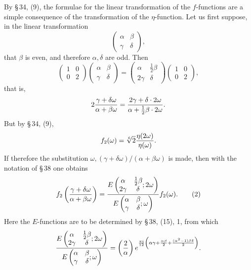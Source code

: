 \documentclass[11pt]{article}
\newcommand{\Jac}[2]{\left(\frac{#1}{#2}\right)}
\begin{document}
By \S\,34, (9), the formulae for the linear transformation of the $f$-functions are a simple consequence of the transformation of the $\eta$-function. Let us first suppose, in the linear transformation
\[
\begin{pmatrix}\alpha&\beta\\ \gamma&\delta\end{pmatrix},
\]
that $\beta$ is even, and therefore $\alpha,\delta$ are odd. Then
\begin{equation}
\begin{pmatrix}1&0\\0&2\end{pmatrix}
\begin{pmatrix}\alpha&\beta\\ \gamma&\delta\end{pmatrix}
=\begin{pmatrix}\alpha&\frac12\beta\\2\gamma&\delta\end{pmatrix}
\begin{pmatrix}1&0\\0&2\end{pmatrix},
\tag{1}
\end{equation}
that is,
\[
2{\gamma+
\delta\omega\over\alpha+
\beta\omega}
={2\gamma+
\delta\cdot2\omega\over\alpha+\frac12\beta\cdot2\omega}.
\]
But by \S\,34, (9),
\[
f_2(\omega)=\sqrt[6]{2}{\eta(2\omega)\over\eta(\omega)}.
\]
If therefore the substitution $\omega, (\gamma+
\delta\omega)/(\alpha+
\beta\omega)$ is made, then with the notation of \S\,38 one obtains
\begin{equation}
f_2\left({\gamma+
\delta\omega\over\alpha+
\beta\omega}\right)
={E\left(\begin{matrix}\alpha&\frac12\beta\\2\gamma&\delta\end{matrix};2\omega\right)
\over
E\left(\begin{matrix}\alpha&\beta\\\gamma&\delta\end{matrix};\omega\right)}f_2(\omega). 
\tag{2}
\end{equation}
Here the $E$-functions are to be determined by \S\,38, (15), 1, from which
\[
{E\left(\begin{matrix}\alpha&\frac12\beta\\2\gamma&\delta\end{matrix};2\omega\right)
\over
E\left(\begin{matrix}\alpha&\beta\\\gamma&\delta\end{matrix};\omega\right)}
=
\Jac{2}{\alpha}e^{{\pi i\over12}\left(\alpha\gamma+{\alpha\beta\over2}+{(\alpha^2-1)\beta\delta\over2}\right)}.
\]
\end{document}
